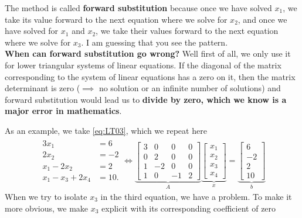 \begin{tcolorbox}[sharp corners, colback=green!30, colframe=green!80!blue, title=\textbf{\Large Forward Substitution}]
The method is called \textbf{forward substitution} because once we have solved $x_1$, we take its value forward to the next equation where we solve for $x_2$, and once we have solved for $x_1$ and $x_2$, we take their values forward to the next equation where we solve for $x_3$. I am guessing that you see the pattern. \\

\textbf{When can forward substitution go wrong?} Well first of all, we only use it for lower triangular systems of linear equations. If the diagonal of the matrix corresponding to the system of linear equations has a zero on it, then the matrix determinant is zero ($\implies$ no solution or an infinite number of solutions) and forward substitution would lead us to \textbf{divide by zero, which we know is a major error in mathematics}. 
\end{tcolorbox}
As an example, we take \eqref{eq:LT03}, which we repeat here
\begin{equation}
\label{eq:LT03b}
\begin{array}{cc}
   \begin{aligned}
     3 x_1 &=6 \\
     2 x_2 &= -2\\
    x_1 - 2 x_2 &= 2 \\
    x_1 - x_3 + 2 x_4 &= 10.
    \end{aligned} \iff \underbrace{\left[\begin{array}{rrcr} 3 & 0 & 0 & 0\\
0 & 2 & 0 & 0\\ 1 & -2& \boxed{0} &0 \\ 1 & 0 & -1 & 2  \end{array}\right]}_{A}  \underbrace{\left[\begin{array}{c} x_1 \\x_2 \\x_3 \\x_4\end{array} \right]}_{x}
= \underbrace{\left[\begin{array}{r} 6 \\-2 \\2 \\10\end{array} \right]}_{b}
    \end{array}
\end{equation}
When we try to isolate $x_3$ in the third equation, we have a problem. To make it more obvious, we make $x_3$ explicit with its corresponding coefficient of zero
